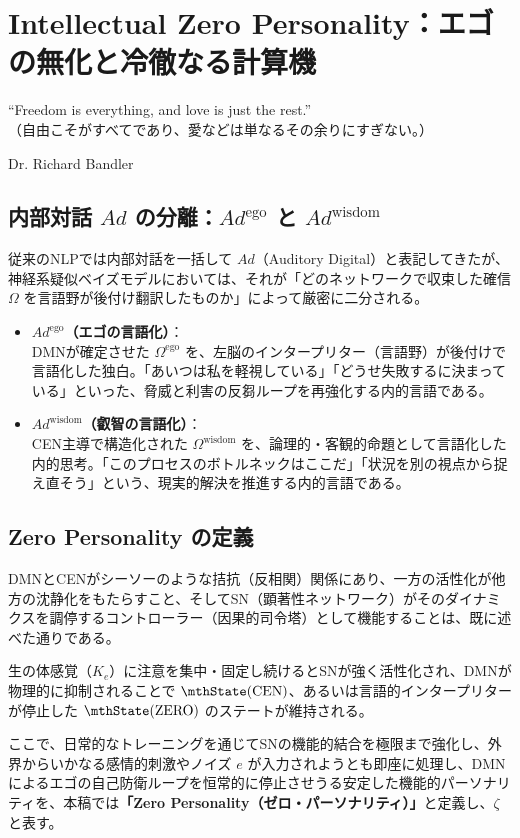 \chapter{Intellectual Zero Personality：エゴの無化と冷徹なる計算機}
\epigraph{``Freedom is everything, and love is just the rest.''\\
（自由こそがすべてであり、愛などは単なるその余りにすぎない。）}{Dr. Richard Bandler}

\section{内部対話 $Ad$ の分離：$Ad^{\mathrm{ego}}$ と $Ad^{\mathrm{wisdom}}$}
従来のNLPでは内部対話を一括して $Ad$（Auditory Digital）と表記してきたが、神経系疑似ベイズモデルにおいては、それが「どのネットワークで収束した確信 $\Omega$ を言語野が後付け翻訳したものか」によって厳密に二分される。

\begin{itemize}
  \item \textbf{$Ad^{\mathrm{ego}}$（エゴの言語化）}：\\
  DMNが確定させた $\Omega^{\mathrm{ego}}$ を、左脳のインタープリター（言語野）が後付けで言語化した独白。「あいつは私を軽視している」「どうせ失敗するに決まっている」といった、脅威と利害の反芻ループを再強化する内的言語である。
  \item \textbf{$Ad^{\mathrm{wisdom}}$（叡智の言語化）}：\\
  CEN主導で構造化された $\Omega^{\mathrm{wisdom}}$ を、論理的・客観的命題として言語化した内的思考。「このプロセスのボトルネックはここだ」「状況を別の視点から捉え直そう」という、現実的解決を推進する内的言語である。
\end{itemize}


\section{Zero Personality の定義}
DMNとCENがシーソーのような拮抗（反相関）関係にあり、一方の活性化が他方の沈静化をもたらすこと、そしてSN（顕著性ネットワーク）がそのダイナミクスを調停するコントローラー（因果的司令塔）として機能することは、既に述べた通りである。

生の体感覚（$K_e$）に注意を集中・固定し続けるとSNが強く活性化され、DMNが物理的に抑制されることで $\mthState(\mathrm{CEN})$、あるいは言語的インタープリターが停止した $\mthState(\mathrm{ZERO})$ のステートが維持される。

ここで、日常的なトレーニングを通じてSNの機能的結合を極限まで強化し、外界からいかなる感情的刺激やノイズ $e$ が入力されようとも即座に処理し、DMNによるエゴの自己防衛ループを恒常的に停止させうる安定した機能的パーソナリティを、本稿では\textbf{「Zero Personality（ゼロ・パーソナリティ）」}と定義し、$\zeta$と表す。

